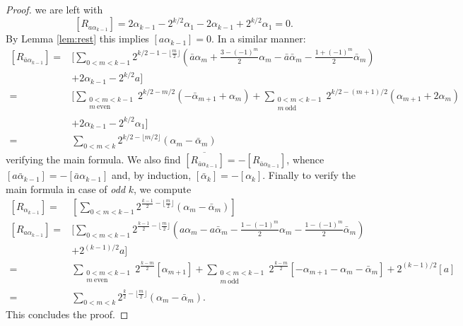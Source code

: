 \documentclass{article}
\theoremstyle{definition}
\begin{document}
\begin{proof}
        we are left with 
        $$ [R_{a\alpha_{k-1}}] = 2\alpha_{k-1}  - 2^{k/2} \alpha_1 - 2\alpha_{k-1} + 2^{k/2}\alpha_1 = 0.$$
        By Lemma \ref{lem:rest} this implies $[a\alpha_{k-1}]=0$. In a similar manner:
        $$\begin{aligned}{}
                [R_{\bar a\alpha_{k-1}}]=& [ \sum_{0 < m < k-1}
                2^{k/2-1
                - \lfloor \frac{m}{2}\rfloor} 
                \left(\bar a \alpha_m + \frac{3  - (-1)^m}{2} \alpha_m 
                - \bar a \bar\alpha_m - \frac{1 + (-1)^m}{2} \bar\alpha_m \right) 
                \\ & +2\alpha_{k-1} - 2^{k/2}a
                ]
                \\{}
                =& [\sum_{\substack{0<m<k-1\\m\ \textrm{even}}} 2^{k/2-m/2} (-\bar\alpha_{m+1} + \alpha_m)
                + \sum_{\substack{0<m<k-1\\m\ \textrm{odd}}} 2^{k/2-(m+1)/2} (\alpha_{m+1} +2\alpha_m )
                \\ & + 2\alpha_{k-1} - 2^{k/2}\alpha_1
                ] \\=&
                \sum_{0<m<k} 2^{k/2 - \lfloor m/2\rfloor} (\alpha_m-\bar\alpha_m)
        \end{aligned}$$
        verifying the main formula. We also find $\overline {[R_{\bar a \alpha_{k-1}}]}
        = - [R_{\bar a\alpha_{k-1}}]$, whence $[a\bar\alpha_{k-1}]=-[\bar a\alpha_{k-1}]$
        and, by induction, $[\bar\alpha_k]=-[\alpha_k]$.
        Finally to verify the main formula in case of \emph{odd} $k$, 
        we compute
        $$\begin{aligned}{}
                [R_{\alpha_{k-1}}] =&
                [
                \sum_{0<m<k-1} 
                2^{\frac{k-1}{2}-\lfloor\frac{m}{2}\rfloor} 
                (\alpha_m-\bar\alpha_m)
                ]
                \\{}
                [R_{a\alpha_{k-1}}] =&
                [
                \sum_{0<m<k-1} 
                2^{\frac{k-1}{2}-\lfloor\frac{m}{2}\rfloor} 
                \left( a\alpha_m - a\bar\alpha_m - \frac{1-(-1)^m}{2}\alpha_m 
                       - \frac{1-(-1)^m}{2}\bar\alpha_m \right)
                      \\ & + 2^{(k-1)/2} a]
                      \\ =&
        \sum_{\substack{0<m<k-1\\m\ \textrm{even}}}
        2^{\frac{k-m}{2}} [\alpha_{m+1}]
        + \sum_{\substack{0<m<k-1\\m\ \textrm{odd}}}
        2^{\frac{k-m}{2}} [-\alpha_{m+1} - \alpha_m-\bar\alpha_m]
                       + 2^{(k-1)/2} [a]
        \\ =& \sum_{0<m<k} 2^{\frac{k}{2}-\lfloor\frac{m}{2}\rfloor} (\alpha_m-\bar\alpha_m).
        \end{aligned}$$
This concludes the proof.
\end{proof}
\end{document}
